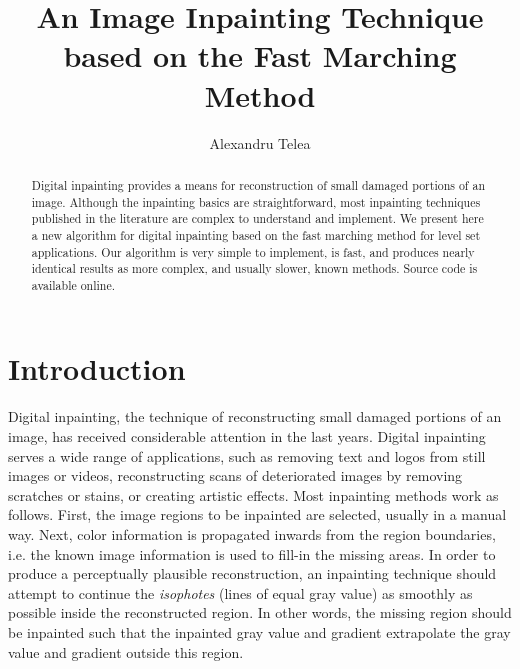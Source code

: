 \documentclass{llncs}
\begin{document}
\mainmatter

%
\title{An Image Inpainting Technique based on the Fast Marching Method}
\author{Alexandru Telea}


%
%
\maketitle
%
%
\begin{abstract} 
% 
  Digital inpainting provides a means for reconstruction of small
damaged portions of an image. Although the inpainting basics are
straightforward, most inpainting techniques published in
the literature are complex to understand and implement.
We present here a new algorithm for digital inpainting based on the fast
marching method for level set applications. Our algorithm is very
simple to implement, is fast, and produces nearly identical results as
more complex, and usually slower, known methods. Source code is available online.
\end{abstract}
%
%
\section{Introduction}
%
%
 Digital inpainting, the technique of reconstructing small damaged portions
of an image, has received considerable attention in the last years.
Digital inpainting serves a wide range of
applications, such as removing text and logos from still images or videos, reconstructing
scans of deteriorated images by removing scratches or stains, or creating
artistic effects.
 Most inpainting methods work as follows. First, the
image regions to be inpainted are selected, usually in a
manual way. Next, color information is propagated inwards from the region
boundaries, i.e. the known image information is used to fill-in the missing areas. 
In order to produce a perceptually plausible reconstruction, an inpainting
technique should attempt to continue the 
\textit{isophotes} (lines of equal gray value) as smoothly as possible inside the
reconstructed region. In other words, the missing region should be inpainted
such that the inpainted gray value and gradient extrapolate
the gray value and gradient outside this region. 
  
\end{document}
